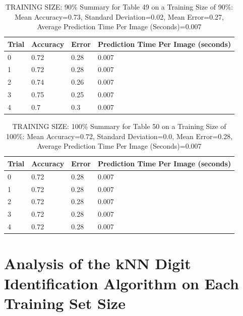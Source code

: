 \documentclass{article}
\begin{document}
\begin{table}[H]

\centering
{\begin{tabular}{||p{1cm}|p{1.8cm}|p{1.8cm}|p{3cm}||}
 \hline
Trial & Accuracy & Error & Prediction Time Per Image (seconds) \\ [0.5ex] 
 \hline\hline
    0  & 0.72  & 0.28  & 0.007\\
\hline
    1  & 0.72  & 0.28  & 0.007\\
\hline
    2  & 0.74  & 0.26  & 0.007\\
\hline
    3  & 0.75  & 0.25  & 0.007\\
\hline
    4  & 0.7  & 0.3  & 0.007\\
\hline

\end{tabular}}
\caption{TRAINING SIZE: 90\% \newline Summary for Table 49 on a Training Size of 90\%: Mean Accuracy=0.73, Standard Deviation=0.02, Mean Error=0.27, Average Prediction Time Per Image (Seconds)=0.007}
\end{table} 

\begin{table}[H]

\centering
{\begin{tabular}{||p{1cm}|p{1.8cm}|p{1.8cm}|p{3cm}||}
 \hline
Trial & Accuracy & Error & Prediction Time Per Image (seconds) \\ [0.5ex] 
 \hline\hline
    0  & 0.72  & 0.28  & 0.007\\
\hline
    1  & 0.72  & 0.28  & 0.007\\
\hline
    2  & 0.72  & 0.28  & 0.007\\
\hline
    3  & 0.72  & 0.28  & 0.007\\
\hline
    4  & 0.72  & 0.28  & 0.007\\
\hline

\end{tabular}}
\caption{TRAINING SIZE: 100\% \newline Summary for Table 50 on a Training Size of 100\%: Mean Accuracy=0.72, Standard Deviation=0.0, Mean Error=0.28, Average Prediction Time Per Image (Seconds)=0.007}
\end{table} 


\section{Analysis of the kNN Digit Identification Algorithm on Each Training Set Size}
\end{document}
